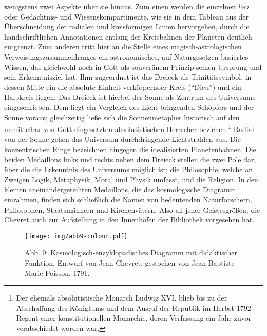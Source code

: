 wenigstens zwei Aspekte über sie hinaus. Zum einen werden die einzelnen
\emph{loci} oder Gedächtnis- und Wissenskompartimente, wie sie in dem
Tableau aus der Überschneidung der radialen und kreisförmigen Linien
hervorgehen, durch die handschriftlichen Annotationen entlang der
Kreisbahnen der Planeten deutlich entgrenzt. Zum anderen tritt hier an
die Stelle eines magisch-astrologischen Verweisungszusammenhanges ein
astronomisches, auf Naturgesetzen basiertes Wissen, das gleichwohl noch
in Gott als souveränem Prinzip seinen Ursprung und sein Erkenntnisziel
hat. Ihm zugeordnet ist das Dreieck als Trinitätssymbol, in dessen Mitte
ein die absolute Einheit verkörpernder Kreis (\enquote{Dieu}) und ein
Halbkreis liegen. Das Dreieck ist hierbei der Sonne als Zentrum des
Universums eingeschrieben. Dem liegt ein Vergleich des Licht bringenden
Schöpfers und der Sonne voraus; gleichzeitig ließe sich die
Sonnenmetapher historisch auf den unmittelbar von Gott eingesetzten
absolutistischen Herrscher beziehen.\footnote{Der ehemals
  absolutistische Monarch Ludwig XVI. blieb bis zu der Abschaffung des
  Königtums und dem Ausruf der Republik im Herbst 1792 Regent einer
  konstitutionellen Monarchie, deren Verfassung ein Jahr zuvor
  verabschiedet worden war.} Radial von der Sonne gehen das Universum
durchdringende Lichtstrahlen aus. Die konzentrischen Ringe bezeichnen
hingegen die idealisierten Planetenbahnen. Die beiden Medaillons links
und rechts neben dem Dreieck stellen die zwei Pole dar, über die die
Erkenntnis des Universums möglich ist: die Philosophie, welche an
Zweigen Logik, Metaphysik, Moral und Physik umfasst, und die Religion.
In den kleinen aneinandergereihten Medaillons, die das kosmologische
Diagramm einrahmen, finden sich schließlich die Namen von bedeutenden
Naturforschern, Philosophen, Staatsmännern und Kirchenvätern. Also all
jener Geistesgrößen, die Chevret auch zur Aufstellung in den Innenhöfen
der Bibliothek vorgesehen hat.

\begin{figure}[htbp]
\centering
\texttt{[image: img/abb9-colour.pdf]}
\caption*{Abb. 9: Kosmologisch-enzyklopädisches Diagramm mit didaktischer
Funktion, Entwurf von Jean Chevret, gestochen von Jean Baptiste Marie
Poisson, 1791.}
\end{figure}

